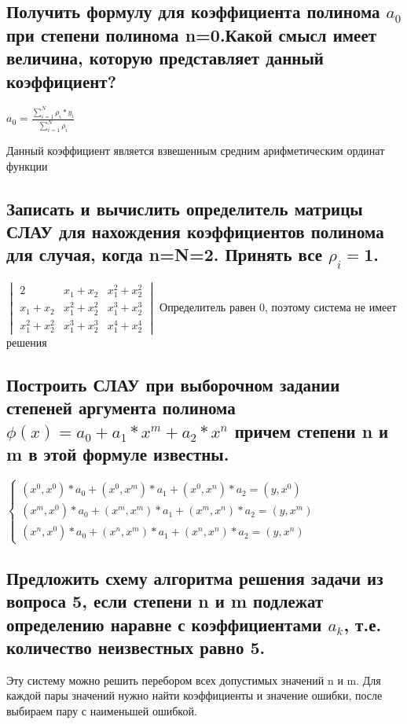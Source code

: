 \documentclass[a4paper,12pt]{article}
\begin{document}
\subsection{Получить формулу для коэффициента  полинома $a_{0}$ при степени полинома n=0.Какой смысл имеет величина, которую представляет данный коэффициент?}

$a_{0} = \frac{\sum_{i=1}^{N} \rho_{i} * y_{i}}{\sum_{i=1}^{N} \rho_{i}}$

Данный коэффициент является взвешенным средним арифметическим ординат функции

\subsection{Записать и вычислить определитель матрицы СЛАУ для нахождения коэффициентов полинома для случая, когда n=N=2. Принять все $\rho_{i} = $1.}

$
\begin{vmatrix}
2 & x_1 + x_2 & x_1^2 + x_2^2 \\
x_1 + x_2 & x_1^2 + x_2^2 & x_1^3 + x_2^3 \\
x_1^2 + x_2^2 & x_1^3 + x_2^3 & x_1^4 + x_2^4
\end{vmatrix}
$
Определитель равен 0, поэтому система не имеет решения

\subsection{ Построить СЛАУ при выборочном задании степеней аргумента полинома $\phi(x) = a_0 + a_1 * x^m + a_2 * x^n$ причем степени n и m в этой формуле известны.}

$
\begin{cases}
    (x^0, x^0)*a_0 + (x^0, x^m)*a_1 + (x^0, x^n)*a_2 = (y, x^0) \\
    (x^m, x^0)*a_0 + (x^m, x^m)*a_1 + (x^m, x^n)*a_2 = (y, x^m) \\
    (x^n, x^0)*a_0 + (x^n, x^m)*a_1 + (x^n, x^n)*a_2 = (y, x^n)
\end{cases}
$

\subsection{Предложить схему алгоритма решения задачи из вопроса 5, если степени n и m подлежат определению наравне с коэффициентами $a_k$, т.е. количество неизвестных равно 5.}

Эту систему можно решить перебором всех допустимых значений n и m. Для каждой пары значений нужно найти коэффициенты и значение ошибки, после выбираем пару с наименьшей ошибкой.
\end{document}
